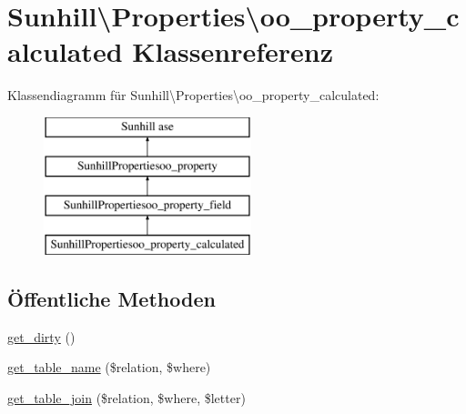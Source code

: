 \hypertarget{classSunhill_1_1Properties_1_1oo__property__calculated}{}\section{Sunhill\textbackslash{}Properties\textbackslash{}oo\+\_\+property\+\_\+calculated Klassenreferenz}
\label{classSunhill_1_1Properties_1_1oo__property__calculated}
Klassendiagramm für Sunhill\textbackslash{}Properties\textbackslash{}oo\+\_\+property\+\_\+calculated\+:\begin{figure}[H]
\begin{center}
\leavevmode
\includegraphics[height=4.000000cm]{d3/db8/classSunhill_1_1Properties_1_1oo__property__calculated}
\end{center}
\end{figure}
\subsection*{Öffentliche Methoden}
\begin{DoxyCompactItemize}
\item 
\hyperlink{classSunhill_1_1Properties_1_1oo__property__calculated_a55358052e349e1d569e589c8c2722e15}{get\+\_\+dirty} ()
\item 
\hyperlink{classSunhill_1_1Properties_1_1oo__property__calculated_ab917b8514022dbedc818768a5dd2151c}{get\+\_\+table\+\_\+name} (\$relation, \$where)
\item 
\hyperlink{classSunhill_1_1Properties_1_1oo__property__calculated_a6bd6682e5522aaea871db79d0730d286}{get\+\_\+table\+\_\+join} (\$relation, \$where, \$letter)
\end{DoxyCompactItemize}
